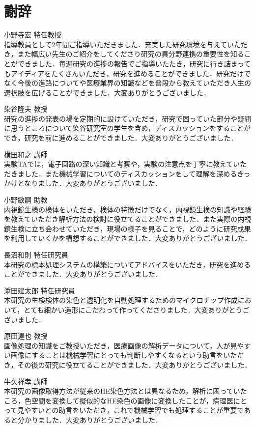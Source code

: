 \chapter*{謝辞}%
%

小野寺宏 特任教授\\
指導教員として2年間ご指導いただきました．充実した研究環境を与えていただき，また幅広い先生のご紹介をしてくださり研究の異分野連携の重要性を知ることができました．毎週研究の進捗の報告でご指導いたたき，研究に行き詰まってもアイディアをたくさんいただき，研究を進めることができました．研究だけでなく今後の進路についてや医療業界の知識などを普段から教えていただき人生の選択肢を広げることができました．大変ありがとうございました．

染谷隆夫 教授\\
研究の進捗の発表の場を定期的に設けていただき，研究で困っていた部分や疑問に思うところについて染谷研究室の学生を含め，ディスカッションをすることができ，研究を前に進めることができました．大変ありがとうございました．

横田和之 講師\\
実験TAでは，電子回路の深い知識と考察や，実験の注意点を丁寧に教えていただきました．また機械学習についてのディスカッションをして理解を深めるきっかけとなりました．大変ありがとうございました．

小野敏嗣 助教\\
内視鏡生検の検体をいただき，検体の特徴だけでなく，内視鏡生検の知識や経験を教えていただき解析方法の検討に役立てることができました．また実際の内視鏡生検に立ち会わせていただき，現場の様子を見ることで，どのように研究成果を利用していくかを構想することができました．大変ありがとうございました．

長沼和則 特任研究員\\
本研究の標本処理システムの構築についてアドバイスをいただき，研究を進めることができました．大変ありがとうございました．

添田建太郎 特任研究員\\
本研究の生検検体の染色と透明化を自動処理するためのマイクロチップ作成において，とても細かい造形にこだわって作ってくださりました．大変ありがとうございました．

原田達也 教授\\
画像処理の知識をご教授いただき，医療画像の解析データについて，人が見やすい画像にすることは機械学習にとっても判断しやすくなるという助言をいただき，その後の研究に役立てることができました．大変ありがとうございました．

牛久祥孝 講師\\
本研究の画像取得方法が従来のHE染色方法とは異なるため，解析に困っていたころ，色空間を変換して擬似的なHE染色の画像に変換したことが，病理医にとって見やすいとの助言をいただき，これで機械学習でも処理することが重要であると分かりました．大変ありがとうございました．

